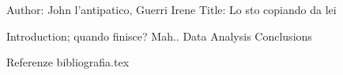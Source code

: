 Author: John l'antipatico, Guerri Irene 
Title: Lo sto copiando da lei


Introduction; quando finisce? Mah..
Data
Analysis
Conclusions

Referenze
bibliografia.tex

